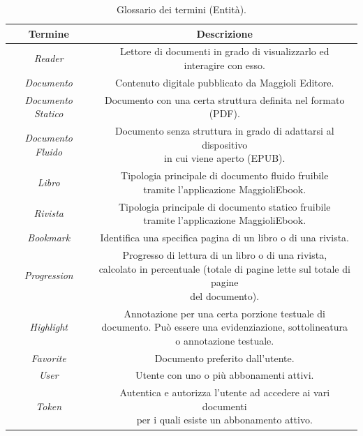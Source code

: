 \begin{table}[H]
\centering
    \begin{tabular}{|c|c|}
         \hline
         \textbf{Termine} & \textbf{Descrizione}\\
         \hline
         \textit{Reader} & \specialcell{Lettore di documenti in grado di visualizzarlo ed \\interagire con esso.}\\
         \hline
         \textit{Documento} & Contenuto digitale pubblicato da Maggioli Editore.\\
         \hline
         \textit{Documento Statico} & Documento con una certa struttura definita nel formato (PDF).\\
         \hline
         \textit{Documento Fluido} & \specialcell{Documento senza struttura in grado di adattarsi al dispositivo\\ in cui viene aperto (EPUB).}\\
         \hline
         \textit{Libro} & \specialcell{Tipologia principale di documento fluido fruibile\\ tramite l'applicazione MaggioliEbook.}\\
         \hline
         \textit{Rivista} & \specialcell{Tipologia principale di documento statico fruibile\\ tramite l'applicazione MaggioliEbook.}\\
         \hline
         \textit{Bookmark} & Identifica una specifica pagina di un libro o di una rivista.\\
         \hline
         \textit{Progression} & \specialcell{Progresso di lettura di un libro o di una rivista,\\ calcolato in percentuale (totale di pagine lette sul totale di pagine\\ del documento).}\\
         \hline
         \textit{Highlight} & \specialcell{Annotazione per una certa porzione testuale di \\documento. Può essere una evidenziazione, sottolineatura \\o annotazione testuale.}\\
         \hline
         \textit{Favorite} &  Documento preferito dall'utente.\\
         \hline
         \textit{User} & Utente con uno o più abbonamenti attivi.\\
         \hline
          \textit{Token} & \specialcell{Autentica e autorizza l'utente ad accedere ai vari documenti\\ per i quali esiste un abbonamento attivo.}\\
         \hline
         \end{tabular}
    \caption{Glossario dei termini (Entità).}
\end{table}


